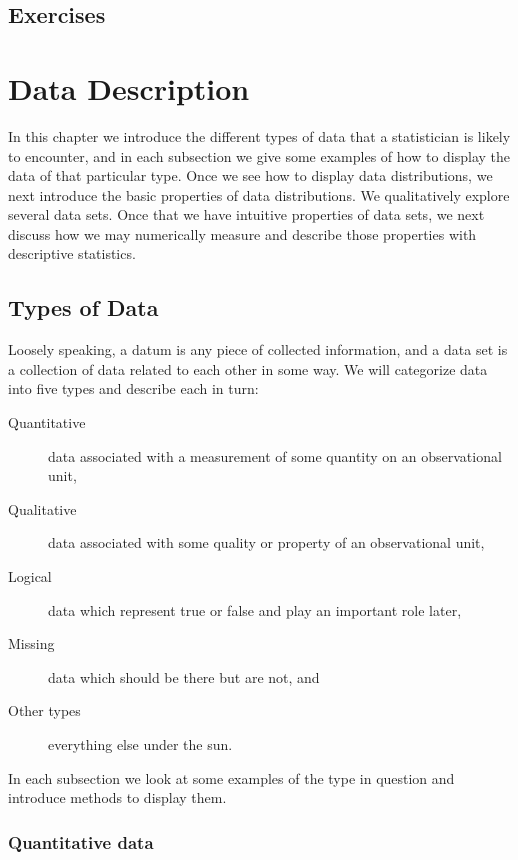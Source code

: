 \documentclass[captions=tableheading]{scrbook}
\begin{document}
\newpage{}
\section{Exercises}
\label{sec-1-3}

\setcounter{thm}{0}
\chapter{Data Description}
\label{sec-2}
\label{cha:Describing-Data-Distributions}


\noindent 
In this chapter we introduce the different types of data that a statistician is likely to encounter, and in each subsection we give some examples of how to display the data of that particular type. Once we see how to display data distributions, we next introduce the basic properties of data distributions. We qualitatively explore several data sets. Once that we have intuitive properties of data sets, we next discuss how we may numerically measure and describe those properties with descriptive statistics.
\section{Types of Data}
\label{sec-2-1}
\label{sec:Types-of-Data}


Loosely speaking, a datum is any piece of collected information, and a data set is a collection of data related to each other in some way. We will categorize data into five types and describe each in turn:

\begin{description}
\item[Quantitative] data associated with a measurement of some quantity on an observational unit,
\item[Qualitative] data associated with some quality or property of an observational unit,
\item[Logical] data which represent true or false and play an important role later,
\item[Missing] data which should be there but are not, and
\item[Other types] everything else under the sun.
\end{description}

In each subsection we look at some examples of the type in question and introduce methods to display them.
\subsection{Quantitative data}
\label{sec-2-1-1}
\label{sub:Quantitative-Data}
\end{document}
